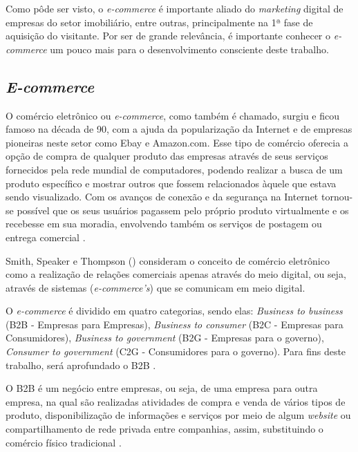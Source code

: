 Como pôde ser visto, o \textit{e-commerce} é importante aliado do \textit{marketing} digital de empresas do setor imobiliário, entre outras, principalmente na 1ª fase de aquisição do visitante. Por ser de grande relevância, é importante conhecer o \textit{e-commerce} um pouco mais para o desenvolvimento consciente deste trabalho.

\subsection{\textit{E-commerce}}

O comércio eletrônico ou \textit{e-commerce}, como também é chamado, surgiu e ficou famoso na década de 90, com a ajuda da popularização da Internet e de empresas pioneiras neste setor como Ebay e Amazon.com. Esse tipo de comércio oferecia a opção de compra de qualquer produto das empresas através de seus serviços fornecidos pela rede mundial de computadores, podendo realizar a busca de um produto específico e mostrar outros que fossem relacionados àquele que estava sendo visualizado. Com os avanços de conexão e da segurança na Internet tornou-se possível que os seus usuários pagassem pelo próprio produto virtualmente e os recebesse em sua moradia, envolvendo também os serviços de postagem ou entrega comercial \cite{Nakamura:2011}.

Smith, Speaker e Thompson (\citeyear{smith2000mais}) consideram o conceito de comércio eletrônico como a realização de relações comerciais apenas através do meio digital, ou seja, através de sistemas (\textit{e-commerce's}) que se comunicam em meio digital.

O \textit{e-commerce} é dividido em quatro categorias, sendo elas: \textit{Business to business} (B2B - Empresas para Empresas), \textit{Business to consumer} (B2C - Empresas para Consumidores), \textit{Business to government} (B2G - Empresas para o governo), \textit{Consumer to government} (C2G - Consumidores para o governo). Para fins deste trabalho, será aprofundado o B2B \cite{Nakamura:2011}.

O B2B é um negócio entre empresas, ou seja, de uma empresa para outra empresa, na qual são realizadas atividades de compra e venda de vários tipos de produto, disponibilização de informações e serviços por meio de algum \textit{website} ou compartilhamento de rede privada entre companhias, assim, substituindo o comércio físico tradicional \cite{Nakamura:2011}.

